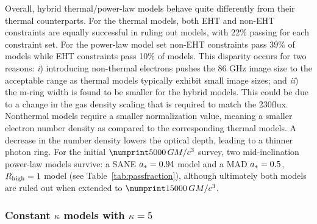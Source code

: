 Overall, \hamr hybrid thermal/power-law models behave quite differently from their thermal counterparts.
For the thermal models, both EHT and non-EHT constraints are equally successful in ruling out models, with 22\% passing for each constraint set. For the power-law model set non-EHT constraints pass 39\% of models while EHT constraints pass 10\% of models.
This disparity occurs for two reasons:
\emph{i}) introducing non-thermal electrons pushes the 86 GHz image size to the acceptable range as thermal models typically exhibit small image sizes; and
\emph{ii}) the m-ring width is found to be smaller for the hybrid models.
This could be due to a change in the gas density scaling that is required to match the 230\GHz flux.
Nonthermal models require a smaller normalization value, meaning a smaller electron number density as compared to the corresponding thermal models.
A decrease in the number density lowers the optical depth, leading to a thinner photon ring.
For the initial $\no{5000}\,\tg$ survey, two mid-inclination power-law models survive: a SANE $a_*=0.94$ model and a MAD $a_*=0.5$, $R_\mathrm{high}=1$ model (see Table~\ref{tab:passfraction}), although ultimately both models are ruled out when extended to $\no{15000}\,\tg$.

\subsubsection{Constant \texorpdfstring{$\kappa$}{kappa} models with \texorpdfstring{$\kappa = 5$}{kappa = 5}}
\label{sec:constant_kappa}

